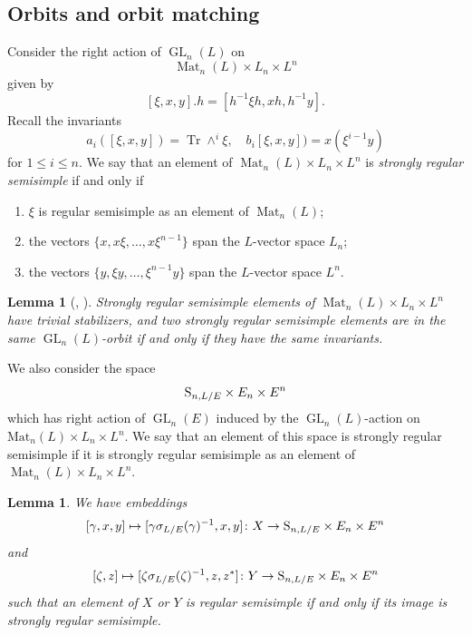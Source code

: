 \documentclass[11pt, reqno]{amsart}
\numberwithin{equation}{subsection}
\theoremstyle{plain}
\newtheorem{lem}[proposition]{Lemma}
\theoremstyle{definition}
\renewcommand{\S}{\textnormal{S}}
\DeclareMathOperator{\GL}{GL}
\DeclareMathOperator{\Mat}{Mat}
\DeclareMathOperator{\Tr}{Tr}
\begin{document}
\subsection{Orbits and orbit matching}
\label{subsec:orbits_and_matching}

Consider the right action of $\GL_n(L)$ on 
\[
    \Mat_n(L) \times L_n \times L^n
\] 
given by
\[
    [\xi, x, y].h = [h^{-1}\xi h, xh, h^{-1} y].
\]
Recall the invariants
\begin{equation}
\label{eq:invar}
    a_i([\xi, x, y]) = \Tr \wedge^i \xi, \quad
    b_i[\xi, x, y]) = x(\xi^{i-1} y)
\end{equation}
for $1 \le i \le n$.
We say that an element of $\Mat_n(L) \times L_n \times L^n$ is 
\emph{strongly regular semisimple} if and only if
\begin{enumerate}
    \item $\xi$ is regular semisimple as an element
    of $\Mat_n(L)$;
    \item the vectors $\{x, x\xi, \dots, x\xi^{n-1}\}$ 
    span the $L$-vector space $L_n$;
    \item the vectors $\{y, \xi y, \dots, \xi^{n-1} y\}$
    span the $L$-vector space $L^n$.
\end{enumerate}

\begin{lem}[{\cite[Lemma~5.6]{Liu2014relative},
\cite[Proposition~6.2~and~Theorem~6.1]{rallis2007multiplicity}}] 
Strongly regular semisimple elements of $\Mat_n(L) \times
L_n \times L^n$
have trivial stabilizers, and two strongly 
regular semisimple
elements are in the same $\GL_n(L)$-orbit if and only
if they have the same invariants.
\end{lem}

We also consider the space
\[
    \S_{n, L/E} \times E_n \times E^n
\]
which has right action of $\GL_n(E)$ induced 
by the $\GL_n(L)$-action on $\mathrm{Mat}_n(L) \times L_n \times L^n$.
We say that an element of this space is strongly
regular semisimple
if it is strongly regular semisimple as an element of 
$\Mat_n(L) \times L_n \times L^n$.



\begin{lem}
We have embeddings
\[
   [\gamma, x, y] \mapsto [\gamma \sigma_{L/E}(\gamma)^{-1}, x, y] \colon X \to 
   \S_{n, L/E} \times E_n \times E^n
\]
and
\[
    [\zeta, z] \mapsto [\zeta \sigma_{L/E}(\zeta)^{-1}, z, z^\ast] \colon
    Y \to \S_{n, L/E} \times E_n \times E^n
\]
such that an element of $X$ or $Y$ is regular
semisimple if and only if its image is strongly regular
semisimple.
\end{lem}
\end{document}
